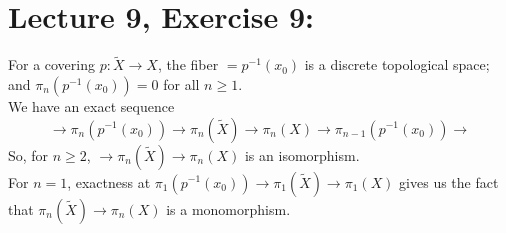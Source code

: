 \documentclass[11pt]{article}
\numberwithin{equation}{section}
\begin{document}
\section{\normalsize{Lecture 9, Exercise 9:}}
For a covering $p:\tilde{X}\rightarrow X$, the fiber $=p^{-1}(x_0)$ is a discrete topological space; and $\pi_n(p^{-1}(x_0)) =0$ for all $n\geqslant 1$. \\[8pt]
We have an exact sequence 
$$\rightarrow \pi_n(p^{-1}(x_0)) \rightarrow \pi_n(\tilde{X})\rightarrow \pi_n(X) \rightarrow \pi_{n-1}(p^{-1}(x_0)) \rightarrow$$
So, for $n\geqslant2$, $\rightarrow \pi_n(\tilde{X})\rightarrow \pi_n(X)$ is an isomorphism. \\[8pt]
For $n=1$, exactness at $\pi_1(p^{-1}(x_0)) \rightarrow \pi_1(\tilde{X})\rightarrow \pi_1(X)$ gives us the fact that $\pi_n(\tilde{X})\rightarrow \pi_n(X)$ is a monomorphism.
\end{document}
